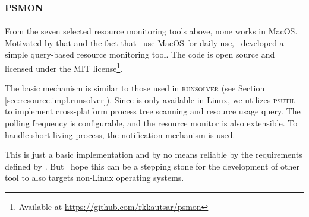 \subsection{\textsc{psmon}}
\label{sec:res.psmon}

From the seven selected resource monitoring tools above, none works in MacOS.
Motivated by that and the fact that \first~use MacOS for daily use, \first~developed a simple query-based resource monitoring tool.
The code is open source and licensed under the MIT license\footnote{Available at \href{https://github.com/rkkautsar/psmon}{https://github.com/rkkautsar/psmon}}.

The basic mechanism is similar to those used in \textsc{runsolver} (see Section \ref{sec:resource.impl.runsolver}).
Since  is only available in Linux, we utilizes \textsc{psutil} to implement cross-platform process tree scanning and resource usage query.
The polling frequency is configurable, and the resource monitor is also extensible.
To handle short-living process, the notification mechanism  is used.

This is just a basic implementation and by no means reliable by the requirements defined by \citet{beyerReliableBenchmarkingRequirements2019}.
But \first~hope this can be a stepping stone for the development of other tool to also targets non-Linux operating systems.

